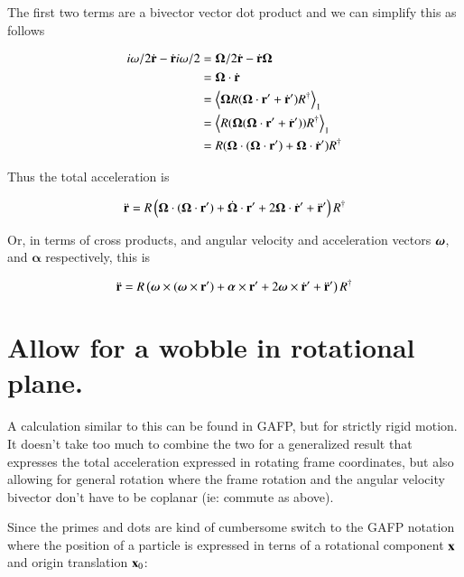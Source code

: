\documentclass{article}      %
\newcommand{\dt}[1]{\dot{#1}}
\newcommand{\ddt}[1]{\ddot{#1}}
\newcommand{\Balpha}[0]{\boldsymbol{\alpha}}
\newcommand{\gpgradeone}[1] {{\left\langle{{#1}}\right\rangle}_{1}}
\newcommand{\BOmega}[0]{\boldsymbol{\Omega}}
\begin{document}
The first two terms are a bivector vector dot product and we can simplify this as follows

\begin{align*}
i \omega /2 \dt{\Br} - \dt{\Br} i \omega /2
&= \BOmega /2 \dt{\Br} - \dt{\Br} \BOmega \\
&= \BOmega \cdot \dt{\Br} \\
&= \gpgradeone{ \BOmega R ( \BOmega \cdot \Br' + \dt{\Br}' ) R^\dagger } \\
&= \gpgradeone{ R ( \BOmega (\BOmega \cdot \Br' + \dt{\Br}') ) R^\dagger } \\
&= R ( \BOmega \cdot (\BOmega \cdot \Br') + \BOmega \cdot \dt{\Br}') R^\dagger \\
\end{align*}

Thus the total acceleration is

\begin{equation}
\ddt{\Br} = R \left( \BOmega \cdot (\BOmega \cdot \Br') +\dot{\BOmega} \cdot \Br' + 2 \BOmega \cdot \dt{\Br}' + \ddt{\Br}' \right) R^\dagger
\end{equation}

Or, in terms of cross products, and angular velocity and acceleration vectors $\boldsymbol{\omega}$, and $\Balpha$ respectively, this is

\begin{equation}\label{eqn:accelerationfixedrotplane}
\ddt{\Br} = R \left( \Bomega \cross (\Bomega \cross \Br') + \Balpha \cross \Br' + 2 \Bomega \cross \dt{\Br}' + \ddt{\Br}' \right) R^\dagger
\end{equation}

\section{ Allow for a wobble in rotational plane. }

A calculation similar to this can be found in GAFP, but for strictly rigid motion.  It doesn't take too much to combine the two for a generalized result that
expresses the total acceleration expressed in rotating frame coordinates, but also allowing for general rotation where the frame rotation and the angular velocity
bivector don't have to be coplanar (ie: commute as above).

Since the primes and dots are kind of cumbersome switch to the GAFP notation where the position of a particle is expressed in terns of a rotational component $\mathbf{x}$
and origin translation $\mathbf{x}_0$:
\end{document}
